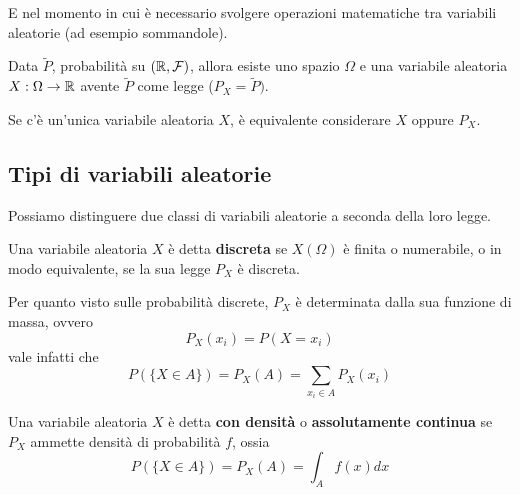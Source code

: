 E nel momento in cui è necessario svolgere operazioni matematiche tra variabili aleatorie (ad
esempio sommandole).

\begin{observation}
	Data $\tilde{P}$, probabilità su $(\mathbb{R}, \mathcal{F})$, allora esiste uno spazio $\Omega$ e una variabile
	aleatoria $X : \Omega \to \mathbb{R}$ avente $\tilde{P}$ come legge ($P_X = \tilde{P})$.
\end{observation}

\begin{observation}
	Se c'è un'unica variabile aleatoria $X$, è equivalente considerare $X$ oppure $P_X$.
\end{observation}

\subsection{Tipi di variabili aleatorie}
Possiamo distinguere due classi di variabili aleatorie a seconda della loro legge.

\begin{definition}
	Una variabile aleatoria $X$ è detta \textbf{discreta} se $X(\Omega)$ è finita o numerabile, o
	in modo equivalente, se la sua legge $P_X$ è discreta.
\end{definition}

Per quanto visto sulle probabilità discrete, $P_X$ è determinata dalla sua funzione di massa,
ovvero
\[ P_X (x_i) = P(X = x_i) \]
vale infatti che
\[ P(\{X \in A\}) = P_X (A) = \sum_{x_i \in A} P_X (x_i) \]

\begin{definition}
	Una variabile aleatoria $X$ è detta \textbf{con densità} o \textbf{assolutamente continua} se
	$P_X$ ammette densità di probabilità $f$, ossia
	\[ P(\{X \in A\}) = P_X (A) = \int_A f(x) dx \]
\end{definition}

